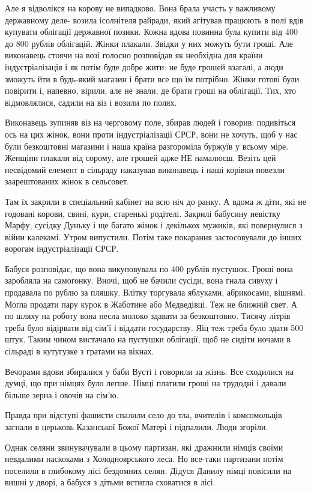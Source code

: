 Але я відволікся на корову не випадково.  Вона брала участь у важливому
державному деле- возила ісолнітеля райради, який агітував працюють в полі вдів
купувати облігації державної позики.  Кожна вдова повинна була купити від 400
до 800 рублів облігацій.  Жінки плакали.  Звідки у них можуть бути гроші.  Але
виконавець стоячи на возі голосно розповідав як необхідна для країни
індустріалізація і як потім буде добре жити: не буде грошей взагалі, а люди
зможуть йти в будь-який магазин і брати все що їм потрібно.  Жінки готові були
повірити і, напевно, вірили, але не знали, де брати гроші на облігації.  Тих,
хто відмовлялися, садили на віз і возили по полях.  

Виконавець зупиняв віз на черговому поле, збирав людей і говорив: подивіться
ось на цих жінок, вони проти індустріалізації СРСР, вони не хочуть, щоб у нас
були безкоштовні магазини і наша країна разгороміла буржуїв у всьому міре.
Женщіни плакали від сорому, але грошей адже  НЕ намалюєш.  Везіть цей
несвідомий елемент в сільраду наказував виконавець і наші корівки повезли
заарештованих жінок в сельсовет. 

Там їх закрили в спеціальний кабінет на всю ніч до ранку.  А вдома ж діти, які
не годовані корови, свині, кури, старенькі родітелі. Закрилі бабусину невістку
Марфу, сусідку Дуньку і ще багато жінок і декількох мужиків, які повернулися з
війни калекамі. Утром випустили.  Потім таке покарання застосовували до інших
ворогам індустріалізації СРСР.  

Бабуся розповідає, що вона викуповувала по 400 рублів пустушок.  Гроші вона
заробляла на самогонку.  Вночі, щоб не бачили сусіди, вона гнала сивуху і
продавала по рублю за пляшку.  Влітку торгувала яблуками, абрикосами, вішнямі.
Могла продати пару курок в Жаботине або Медведівці.  Теж не ближній свет. А по
шляху на роботу вона несла молоко здавати за безкоштовно.  Тисячу літрів треба
було відірвати від сім'ї і віддати государству. Яіц теж треба було здати 500
штук.  Таким чином вистачало на пустушки облігації, щоб не сидіти ночами в
сільраді в кутугузке з гратами на вікнах.  

Вечорами вдови збиралися у баби Вусті і говорили за жізнь. Все
сходилися на думці, що при німцях було легше.  Німці платили гроші на трудодні
і давали більше зерна і овочів на сім'ю.  

Правда при відступі фашисти спалили село до тла, вчителів і комсомольців
загнали в церьковь Казанської Божої Матері і підпалили.  Люди згоріли.  

Однак селяни звинувачували в цьому партизан, які дражнили німців своїми
невдалими наскоками з Холодноярського леса. Но все-таки партизани потім
поселили в глибокому лісі бездомних селян.  Дідуся Данилу німці повісили на
вишні у дворі, а бабуся з дітьми встигла сховатися в лісі.  

